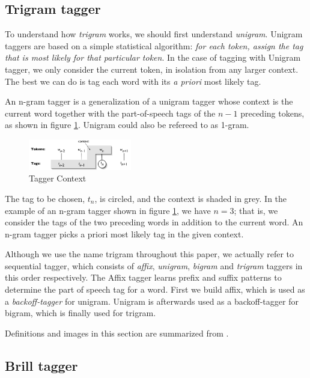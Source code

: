\documentclass[10pt, conference, compsocconf]{IEEEtran}
\begin{document}
\subsection{Trigram tagger}
To understand how \textit{trigram} works, we should first understand \textit{unigram}.
Unigram taggers are based on a simple statistical algorithm: \textit{for each token, assign the tag that is most likely for that particular token}.
In the case of tagging with Unigram tagger, we only consider the current token, in isolation from any larger context. The best we can do is tag each word with its \textit{a priori} most likely tag.
\par
An n-gram tagger is a generalization of a unigram tagger whose context is the current word together with the part-of-speech tags of the $n-1$ preceding tokens, as shown in figure \ref{fig:trigram}. Unigram could also be refereed to as 1-gram.

\begin{figure}[h]
\begin{center}
\includegraphics[width=0.4\textwidth]{tag-context.png} 
\end{center}
\caption{Tagger Context}
\label{fig:trigram}
\end{figure}

The tag to be chosen, $t_{n}$, is circled, and the context is shaded in grey.
In the example of an n-gram tagger shown in figure \ref{fig:trigram}, we have $n=3$; that is, we consider the tags of the two preceding words in addition to the current word.
An n-gram tagger picks a priori most likely tag in the given context.
\par
Although we use the name trigram throughout this paper, we actually refer to sequential tagger, which consists of
\textit{affix}, \textit{unigram}, \textit{bigram} and \textit{trigram} taggers in this order respectively. The Affix tagger learns prefix and suffix patterns to determine the part of speech tag for a word. First we build affix, which is used as a \textit{backoff-tagger} for unigram. Unigram is afterwards used as a backoff-tagger for bigram, which is finally used for trigram.
\par
Definitions and images in this section are summarized from \cite{NLTKBOOK}.

\subsection{Brill tagger} %
\end{document}

